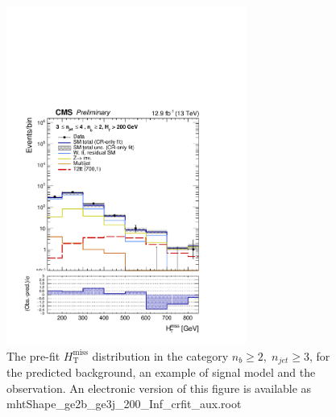 \clearpage
\begin{figure}[tbhp]
    \caption{ 
    The pre-fit $H_{\mathrm{T}}^{\mathrm{miss}}$ distribution in the category $n_{b}\geq 2, \; n_{jet} \geq 3$, 
    for the predicted background, an example of signal model and the observation.
    An electronic version of this figure is available as mhtShape\_ge2b\_ge3j\_200\_Inf\_crfit\_aux.root
    \label{fig:mhtShape_ge2b_ge3j_crfit} }
  \begin{center}
  \includegraphics[width=0.7\textwidth]{mhtShape_ge2b_ge3j_200_Inf_crfit_aux}
  \end{center}
\end{figure}


